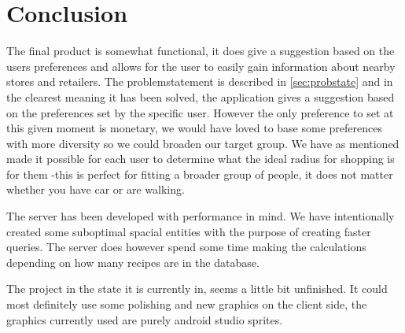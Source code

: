 \section{Conclusion}
\label{sec:conc}

The final product is somewhat functional, it does give a suggestion based on the users preferences and allows for the user to easily gain information about nearby stores and retailers. The problemstatement is described in \ref{sec:probstate} and in the clearest meaning it has been solved, the application gives a suggestion based on the preferences set by the specific user. However the only preference to set at this given moment is monetary, we would have loved to base some preferences with more diversity so we could broaden our target group. We have as mentioned made it possible for each user to determine what the ideal radius for shopping is for them -this is perfect for fitting a broader group of people, it does not matter whether you have car or are walking.

The server has been developed with performance in mind. We have intentionally created some suboptimal spacial entities with the purpose of creating faster queries. The server does however spend some time making the calculations depending on how many recipes are in the database. 

The project in the state it is currently in, seems a little bit unfinished. It could most definitely use some polishing and new graphics on the client side, the graphics currently used are purely android studio sprites. 

